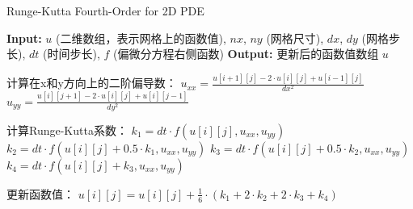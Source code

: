


\begin{algorithm}
    \caption{Runge-Kutta Fourth-Order for 2D PDE}
    \begin{algorithmic}[1]
    \State \textbf{Input:} $u$ (二维数组，表示网格上的函数值), $nx$, $ny$ (网格尺寸), $dx$, $dy$ (网格步长), $dt$ (时间步长), $f$ (偏微分方程右侧函数)
    \State \textbf{Output:} 更新后的函数值数组 $u$
    
                \State 计算在x和y方向上的二阶偏导数：
                \State \quad $u_{xx} = \frac{u[i+1][j] - 2 \cdot u[i][j] + u[i-1][j]}{dx^2}$
                \State \quad $u_{yy} = \frac{u[i][j+1] - 2 \cdot u[i][j] + u[i][j-1]}{dy^2}$
                
                \State 计算Runge-Kutta系数：
                \State \quad $k_1 = dt \cdot f(u[i][j], u_{xx}, u_{yy})$
                \State \quad $k_2 = dt \cdot f(u[i][j] + 0.5 \cdot k_1, u_{xx}, u_{yy})$
                \State \quad $k_3 = dt \cdot f(u[i][j] + 0.5 \cdot k_2, u_{xx}, u_{yy})$
                \State \quad $k_4 = dt \cdot f(u[i][j] + k_3, u_{xx}, u_{yy})$
                
                \State 更新函数值：
                \State \quad $u[i][j] = u[i][j] + \frac{1}{6} \cdot (k_1 + 2 \cdot k_2 + 2 \cdot k_3 + k_4)$
            \EndFor
        \EndFor
    \EndFor
    \end{algorithmic}
\end{algorithm}
    
